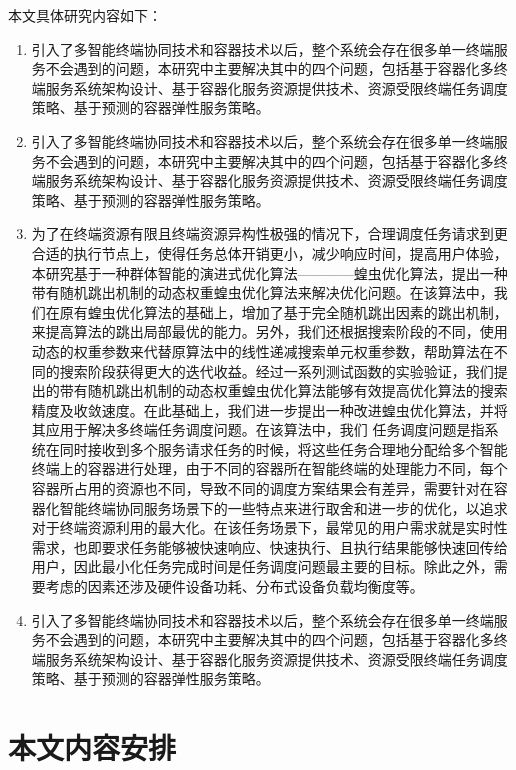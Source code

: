 本文具体研究内容如下：
\begin{enumerate}
    \item 引入了多智能终端协同技术和容器技术以后，整个系统会存在很多单一终端服务不会遇到的问题，本研究中主要解决其中的四个问题，包括基于容器化多终端服务系统架构设计、基于容器化服务资源提供技术、资源受限终端任务调度策略、基于预测的容器弹性服务策略。
    \item 引入了多智能终端协同技术和容器技术以后，整个系统会存在很多单一终端服务不会遇到的问题，本研究中主要解决其中的四个问题，包括基于容器化多终端服务系统架构设计、基于容器化服务资源提供技术、资源受限终端任务调度策略、基于预测的容器弹性服务策略。
    \item 为了在终端资源有限且终端资源异构性极强的情况下，合理调度任务请求到更合适的执行节点上，使得任务总体开销更小，减少响应时间，提高用户体验，本研究基于一种群体智能的演进式优化算法————蝗虫优化算法，提出一种带有随机跳出机制的动态权重蝗虫优化算法来解决优化问题。在该算法中，我们在原有蝗虫优化算法的基础上，增加了基于完全随机跳出因素的跳出机制，来提高算法的跳出局部最优的能力。另外，我们还根据搜索阶段的不同，使用动态的权重参数来代替原算法中的线性递减搜索单元权重参数，帮助算法在不同的搜索阶段获得更大的迭代收益。经过一系列测试函数的实验验证，我们提出的带有随机跳出机制的动态权重蝗虫优化算法能够有效提高优化算法的搜索精度及收敛速度。在此基础上，我们进一步提出一种改进蝗虫优化算法，并将其应用于解决多终端任务调度问题。在该算法中，我们
    任务调度问题是指系统在同时接收到多个服务请求任务的时候，将这些任务合理地分配给多个智能终端上的容器进行处理，由于不同的容器所在智能终端的处理能力不同，每个容器所占用的资源也不同，导致不同的调度方案结果会有差异，需要针对在容器化智能终端协同服务场景下的一些特点来进行取舍和进一步的优化，以追求对于终端资源利用的最大化。在该任务场景下，最常见的用户需求就是实时性需求，也即要求任务能够被快速响应、快速执行、且执行结果能够快速回传给用户，因此最小化任务完成时间是任务调度问题最主要的目标。除此之外，需要考虑的因素还涉及硬件设备功耗、分布式设备负载均衡度等。
    \item 引入了多智能终端协同技术和容器技术以后，整个系统会存在很多单一终端服务不会遇到的问题，本研究中主要解决其中的四个问题，包括基于容器化多终端服务系统架构设计、基于容器化服务资源提供技术、资源受限终端任务调度策略、基于预测的容器弹性服务策略。
\end{enumerate}
\section{本文内容安排}